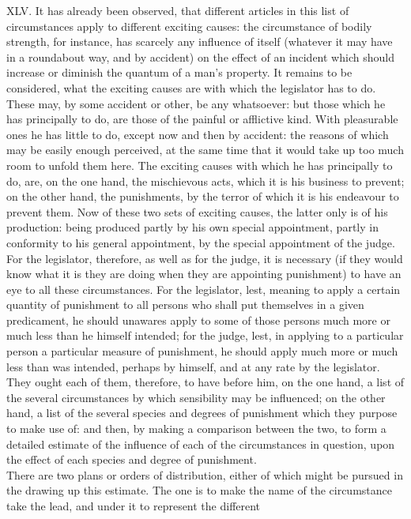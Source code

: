 \documentclass[12pt]{report}
\begin{document}
XLV. It has already been observed, that different articles in this list
of circumstances apply to different exciting causes: the circumstance of
bodily strength, for instance, has scarcely any influence of itself
(whatever it may have in a roundabout way, and by accident) on the
effect of an incident which should increase or diminish the quantum of a
man's property. It remains to be considered, what the exciting causes
are with which the legislator has to do. These may, by some accident or
other, be any whatsoever: but those which he has principally to do, are
those of the painful or afflictive kind. With pleasurable ones he has
little to do, except now and then by accident: the reasons of which may
be easily enough perceived, at the same time that it would take up too
much room to unfold them here. The exciting causes with which he has
principally to do, are, on the one hand, the mischievous acts, which it
is his business to prevent; on the other hand, the punishments, by the
terror of which it is his endeavour to prevent them. Now of these two
sets of exciting causes, the latter only is of his production: being
produced partly by his own special appointment, partly in conformity to
his general appointment, by the special appointment of the judge. For
the legislator, therefore, as well as for the judge, it is necessary (if
they would know what it is they are doing when they are appointing
punishment) to have an eye to all these circumstances. For the
legislator, lest, meaning to apply a certain quantity of punishment to
all persons who shall put themselves in a given predicament, he should
unawares apply to some of those persons much more or much less than he
himself intended; for the judge, lest, in applying to a particular
person a particular measure of punishment, he should apply much more or
much less than was intended, perhaps by himself, and at any rate by the
legislator. They ought each of them, therefore, to have before him, on
the one hand, a list of the several circumstances by which sensibility
may be influenced; on the other hand, a list of the several species and
degrees of punishment which they purpose to make use of: and then, by
making a comparison between the two, to form a detailed estimate of the
influence of each of the circumstances in question, upon the effect of
each species and degree of punishment.\\
There are two plans or orders of distribution, either of which might be
pursued in the drawing up this estimate. The one is to make the name of
the circumstance take the lead, and under it to represent the different
\end{document}
